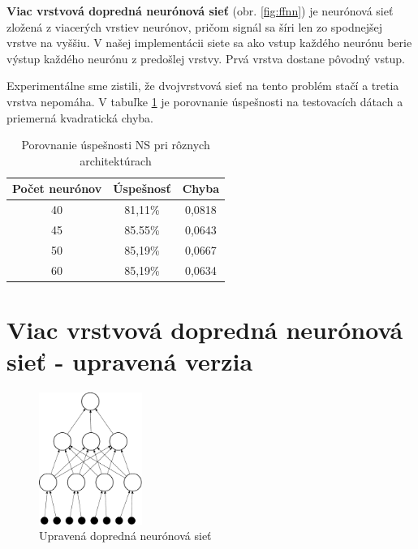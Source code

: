\textbf{Viac vrstvová dopredná neurónová sieť} (obr. \ref{fig:ffnn}) je neurónová sieť zložená z viacerých vrstiev neurónov, pričom signál sa šíri len zo spodnejšej vrstve na vyššiu. V našej implementácii siete sa ako vstup každého neurónu berie výstup každého neurónu z predošlej vrstvy. Prvá vrstva dostane pôvodný vstup. 

Experimentálne sme zistili, že dvojvrstvová sieť na tento problém stačí a tretia vrstva nepomáha.
V tabuľke \ref{tab:neuroncountcmp} je porovnanie úspešnosti na testovacích dátach a priemerná kvadratická chyba.

\begin{table}[hp]
\centering
\begin{tabular}{|c|c|c|}
\hline
\textbf{Počet neurónov} & \textbf{Úspešnosť} & \textbf{Chyba}\\ \hline
40 & 81,11\% & 0,0818\\ \hline
45 & 85.55\% & 0,0643\\ \hline
50 & 85,19\% & 0,0667\\ \hline
60 & 85,19\% & 0,0634\\ 
\hline
\end{tabular}
\caption{Porovnanie úspešnosti NS pri rôznych architektúrach}
\label{tab:neuroncountcmp}
\end{table}


\section{Viac vrstvová dopredná neurónová sieť - upravená verzia}

\begin{figure}[hp]
  \begin{center}
    \includegraphics[width=0.3\textwidth]{images/dffnn}
  \end{center}
  \caption{Upravená dopredná neurónová sieť}
  \label{fig:dffnn}
\end{figure}


